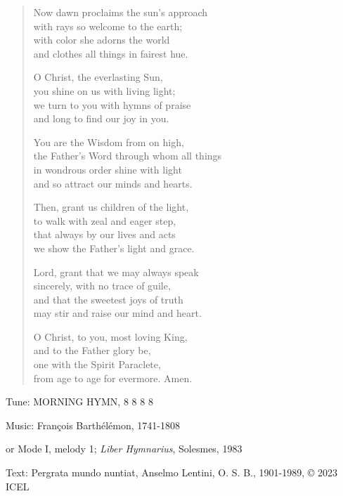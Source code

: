 \hymn

\begin{verse}
Now dawn proclaims the sun’s approach\\
with rays so welcome to the earth;\\
with color she adorns the world\\
and clothes all things in fairest hue.

O Christ, the everlasting Sun,\\
you shine on us with living light;\\
we turn to you with hymns of praise\\
and long to find our joy in you.

You are the Wisdom from on high,\\
the Father’s Word through whom all things\\
in wondrous order shine with light\\
and so attract our minds and hearts.

Then, grant us children of the light,\\
to walk with zeal and eager step,\\
that always by our lives and acts\\
we show the Father’s light and grace.

Lord, grant that we may always speak\\
sincerely, with no trace of guile,\\
and that the sweetest joys of truth\\
may stir and raise our mind and heart.

O Christ, to you, most loving King,\\
and to the Father glory be,\\
one with the Spirit Paraclete,\\
from age to age for evermore. Amen.
\end{verse}

\begin{hymnsource}
Tune: MORNING HYMN, 8 8 8 8

Music: François Barthélémon, 1741-1808

or Mode I, melody 1; \emph{Liber Hymnarius}, Solesmes, 1983

Text: Pergrata mundo nuntiat, Anselmo Lentini, O. S. B., 1901-1989, © 2023 ICEL
\end{hymnsource}